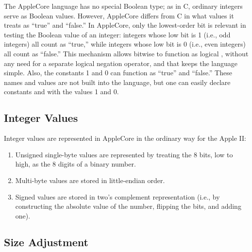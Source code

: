 \documentclass[10pt]{article}
\begin{document}
The AppleCore language has no special Boolean type; as in C, ordinary
integers serve as Boolean values.  However, AppleCore differs from C
in what values it treats as ``true'' and ``false.''  In AppleCore,
only the lowest-order bit is relevant in testing the Boolean value of
an integer: integers whose low bit is 1 (i.e., odd integers) all count
as ``true,'' while integers whose low bit is 0 (i.e., even integers)
all count as ``false.''  This mechanism allows bitwise  to
function as logical , without any need for a separate logical
negation operator, and that keeps the language simple.  Also, the
constants 1 and 0 can function as ``true'' and ``false.''  These names
and values are not built into the language, but one can easily declare
constants  and  with the values 1 and 0.

\subsection{Integer Values}
\label{sec:code-gen:integers}

Integer values are represented in AppleCore in the ordinary way for
the Apple II:
%
\begin{enumerate}
%
\item Unsigned single-byte values are represented by treating the 8
  bits, low to high, as the 8 digits of a binary number.
%
\item Multi-byte values are stored in little-endian order.
%
\item Signed values are stored in two's complement representation
  (i.e., by constructing the absolute value of the number, flipping
  the bits, and adding one).
%
\end{enumerate}



\subsection{Size Adjustment}
\label{sec:code-gen:size-adjustment}
\end{document}
